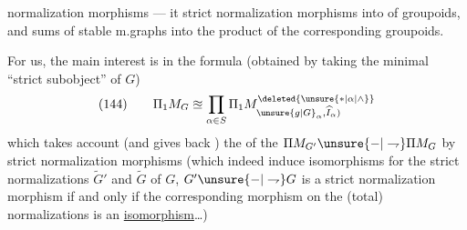 normalization morphisms — it  strict normalization morphisms into  of groupoids, and sums of stable m.graphs into the product of the corresponding groupoids.

For us, the main interest is in the formula (obtained by taking the minimal ``strict subobject'' of $G$)
\[
(144)\qquad \Pi_1M_G\approxeq\prod_{\alpha\in S}\Pi_1M_{\unsure{g|G}_\alpha,\widehat I_\alpha)}^{\deleted{\unsure{*|\alpha|\wedge}}}
\]
which takes account  (and gives back ) the  of the $\Pi M_{G'}\unsure{-|\rightharpoondown}\Pi M_G$ by strict normalization morphisms (which indeed induce isomorphisms for the strict normalizations $\widetilde G'$ and $\widetilde G$ of $G$,
$G'\unsure{-|\rightharpoondown}G$ is a strict normalization morphism if and only if the corresponding morphism on the (total) normalizations is an \uline{isomorphism}\ldots)
